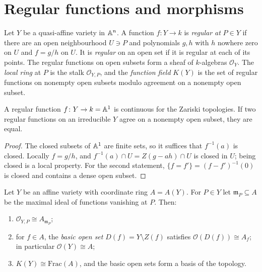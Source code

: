 \section{Regular functions and morphisms}\label{varieties:section-regular}

\begin{definition}\label{varieties:definition-regular-affine}
Let $Y$ be a quasi-affine variety in $\mathbb{A}^n$. A function $f \colon Y \to k$ is \emph{regular at} $P \in Y$ if there are an open neighbourhood
$U \ni P$ and polynomials $g, h$ with $h$ nowhere zero on $U$ and $f = g/h$ on $U$. It is \emph{regular} on an open set if it is regular at
each of its points. The regular functions on open subsets form a sheaf of $k$-algebras $\mathcal{O}_Y$. The \emph{local ring} at $P$ is the stalk
$\mathcal{O}_{Y,P}$, and the \emph{function field} $K(Y)$ is the set of regular functions on nonempty open subsets modulo agreement on a
nonempty open subset.
\end{definition}

\begin{lemma}\label{varieties:lemma-regular-continuous}
A regular function $f \colon Y \to k = \mathbb{A}^1$ is continuous for the Zariski topologies. If two regular functions on an irreducible $Y$ agree on
a nonempty open subset, they are equal.
\end{lemma}

\begin{proof}
The closed subsets of $\mathbb{A}^1$ are finite sets, so it suffices that $f^{-1}(a)$ is closed. Locally $f = g/h$, and
$f^{-1}(a) \cap U = Z(g - ah) \cap U$ is closed in $U$; being closed is a local property. For the second statement, $\{f = f'\} = (f - f')^{-1}(0)$
is closed and contains a dense open subset.
\end{proof}

\begin{theorem}\label{varieties:theorem-regular-functions-affine}
Let $Y$ be an affine variety with coordinate ring $A = A(Y)$. For $P \in Y$ let $\mathfrak{m}_P \subseteq A$ be the maximal ideal of functions
vanishing at $P$. Then:
\begin{enumerate}
\item $\mathcal{O}_{Y,P} \cong A_{\mathfrak{m}_P}$;
\item for $f \in A$, the \emph{basic open set} $D(f) = Y \setminus Z(f)$ satisfies $\mathcal{O}(D(f)) \cong A_f$; in particular
$\mathcal{O}(Y) \cong A$;
\item $K(Y) \cong \mathrm{Frac}(A)$, and the basic open sets form a basis of the topology.
\end{enumerate}
\end{theorem}

